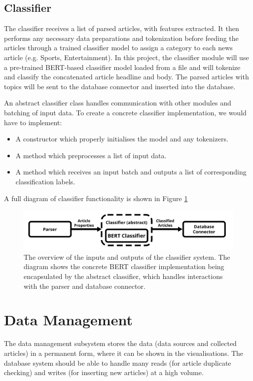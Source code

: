 \documentclass{l4proj}
\begin{document}
\subsection{Classifier}
The classifier receives a list of parsed articles, with features extracted. It then performs any necessary data preparations and tokenization before feeding the articles through a trained classifier model to assign a category to each news article (e.g. Sports, Entertainment). In this project, the classifier module will use a pre-trained BERT-based classifier model loaded from a file and will tokenize and classify the concatenated article headline and body. The parsed articles with topics will be sent to the database connector and inserted into the database. \par
An abstract classifier class handles communication with other modules and batching of input data. To create a concrete classifier implementation, we would have to implement:
\begin{itemize}
    \item A constructor which properly initialises the model and any tokenizers.
    \item A method which preprocesses a list of input data.
    \item A method which receives an input batch and outputs a list of corresponding classification labels.
\end{itemize}

A full diagram of classifier functionality is shown in Figure \ref{fig:classifier_diagram}

 \begin{figure}[h]
\centering
\includegraphics[width=\textwidth]{images/Classifier-diagram.png}
\caption{The overview of the inputs and outputs of the classifier system. The diagram shows the concrete BERT classifier implementation being encapsulated by the abstract classifier, which handles interactions with the parser and database connector.}
\label{fig:classifier_diagram}
\end{figure}

\section{Data Management}
The data management subsystem stores the data (data sources and collected articles) in a permanent form, where it can be shown in the visualisations. The database system should be able to handle many reads (for article duplicate checking) and writes (for inserting new articles) at a high volume. 
\end{document}
